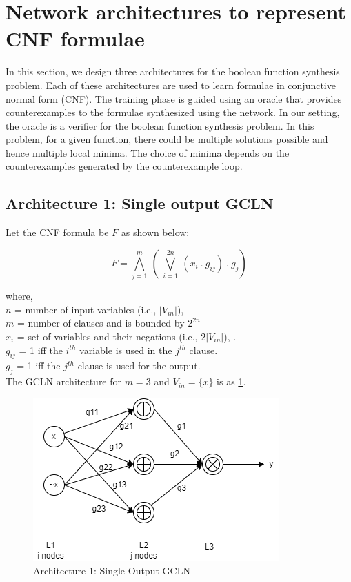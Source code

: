 \clearpage
\section{Network architectures to represent CNF formulae}

In this section,  we design three architectures for the boolean function synthesis problem. Each of these architectures are used to learn formulae in conjunctive normal form (CNF).  The training phase is guided using an oracle that provides counterexamples to the formulae synthesized using the network.  In our setting, the oracle is a verifier for the boolean function synthesis problem.  In this problem,  for a given function, there could be multiple solutions possible and hence multiple local minima.  The choice of minima depends on the counterexamples generated by the counterexample loop.

\subsection{Architecture 1: Single output GCLN}

Let the CNF formula be $F$ as shown below:

\[ F = \bigwedge_{j = 1}^m \ (\  \bigvee_{i=1}^{2n}\  (x_i\ .\ g_{ij})\ .\ g_j)\]

where,  \\ 
$n$ = number of input variables (i.e.,  $|V_{in}|$), \\
$m$ = number of clauses and is bounded by $2^{2n}$ \\
$x_i$ = set of variables and their negations (i.e.,  $2|V_{in}|$), .\\
$g_{ij}$ = 1 iff the $i^{th}$ variable is used in the $j^{th}$ clause.\\
$g_{j}$ = 1 iff the $j^{th}$ clause is used for the output.\\

The GCLN architecture for $m = 3$ and $V_{in} = \{ x\}$ is as \ref{fig:arch1}. \\

\begin{figure}[t]
	\centering
    \includegraphics[scale=0.5]{architecture-1.png}
    \caption{Architecture 1: Single Output GCLN}
    \label{fig:arch1}
\end{figure}

